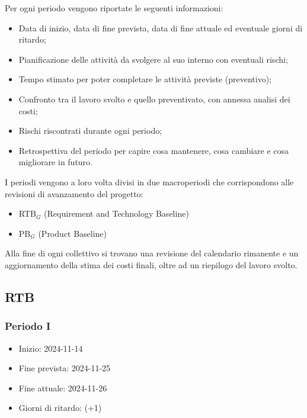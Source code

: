 Per ogni periodo vengono riportate le seguenti informazioni:
\begin{itemize}
    \item Data di inizio, data di fine prevista, data di fine attuale ed eventuale giorni di ritardo;
    \item Pianificazione delle attività da svolgere al suo interno con eventuali rischi;
    \item Tempo stimato per poter completare le attività previste (preventivo);
    \item Confronto tra il lavoro svolto e quello preventivato, con annessa analisi dei costi;
    \item Rischi riscontrati durante ogni periodo;
    \item Retrospettiva del periodo per capire cosa mantenere, cosa cambiare e cosa migliorare in futuro.
\end{itemize}

I periodi vengono a loro volta divisi in due macroperiodi che corrispondono alle revisioni di avanzamento del progetto:
\begin{itemize}
    \item RTB$_G$ (Requirement and Technology Baseline)
    \item PB$_G$ (Product Baseline)
\end{itemize}
Alla fine di ogni collettivo si trovano una revisione del calendario rimanente e un aggiornamento della stima dei costi finali, oltre ad un riepilogo del lavoro svolto.
\subsection{RTB}
\subsubsection{Periodo I}
\begin{itemize}
    \item Inizio: 2024-11-14
    \item Fine prevista: 2024-11-25
    \item Fine attuale: 2024-11-26
    \item Giorni di ritardo: (+1)
\end{itemize}
